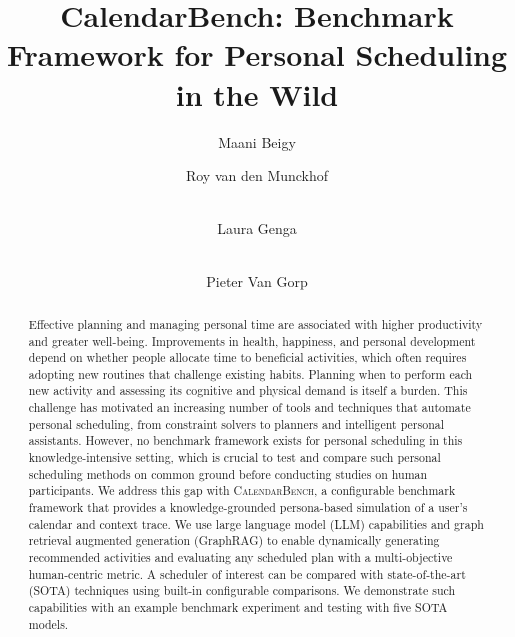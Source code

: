 \documentclass[runningheads]{llncs}
\begin{document}
%
\title{CalendarBench: Benchmark Framework for Personal Scheduling in the Wild}
%
%
\author{Maani Beigy  \and
Roy van den Munckhof \and \\
Laura Genga 
\and \\
Pieter Van Gorp 
}
%
%
%
\maketitle              %
%
\begin{abstract}
Effective planning and managing personal time are associated with higher productivity and greater well-being. Improvements in health, happiness, and personal development depend on whether people allocate time to beneficial activities, which often requires adopting new routines that challenge existing habits. Planning when to perform each new activity and assessing its cognitive and physical demand is itself a burden. This challenge has motivated an increasing number of tools and techniques that automate personal scheduling, from constraint solvers to planners and intelligent personal assistants. However, no benchmark framework exists for personal scheduling in this knowledge-intensive setting, which is crucial to test and compare such personal scheduling methods on common ground before conducting studies on human participants. We address this gap with \textsc{CalendarBench}, a configurable benchmark framework that provides a knowledge-grounded persona-based simulation of a user's calendar and context trace. We use large language model (LLM) capabilities and graph retrieval augmented generation (GraphRAG) to enable dynamically generating recommended activities and evaluating any scheduled plan with a multi-objective human-centric metric. A scheduler of interest can be compared with state-of-the-art (SOTA) techniques using built-in configurable comparisons. We demonstrate such capabilities with an example benchmark experiment and testing with five SOTA models.

\end{abstract}
%
%
%
\end{document}
